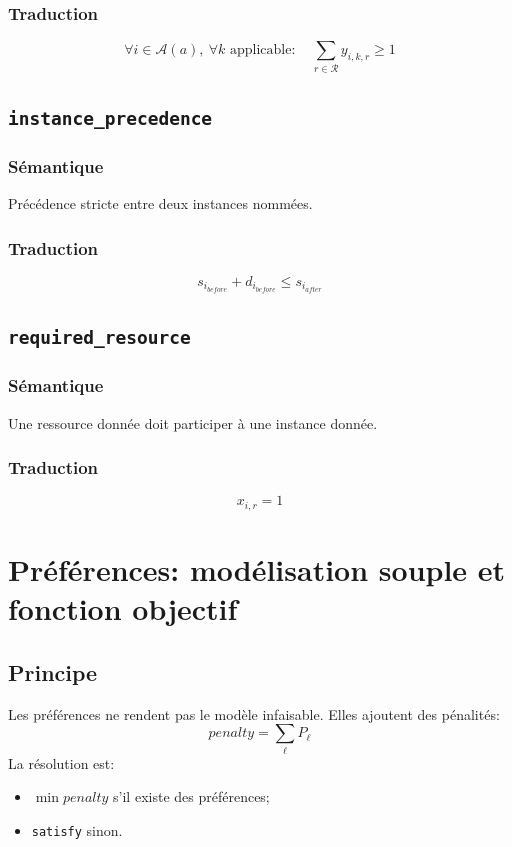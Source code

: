 \documentclass[12pt,a4paper]{article}
\begin{document}
\subsubsection*{Traduction}
\[
\forall i\in\mathcal{A}(a),\ \forall k\text{ applicable}:\quad \sum_{r\in\mathcal{R}} y_{i,k,r}\ge 1
\]

\subsection{\texttt{instance\_precedence}}
\subsubsection*{Sémantique}
Précédence stricte entre deux instances nommées.

\subsubsection*{Traduction}
\[
s_{i_{before}} + d_{i_{before}} \le s_{i_{after}}
\]

\subsection{\texttt{required\_resource}}
\subsubsection*{Sémantique}
Une ressource donnée doit participer à une instance donnée.

\subsubsection*{Traduction}
\[
x_{i,r}=1
\]

\section{Préférences: modélisation souple et fonction objectif}
\subsection{Principe}
Les préférences ne rendent pas le modèle infaisable. Elles ajoutent des pénalités:
\[
penalty = \sum_{\ell} P_\ell
\]
La résolution est:
\begin{itemize}
  \item \(\min penalty\) s'il existe des préférences;
  \item \texttt{satisfy} sinon.
\end{itemize}
\end{document}
